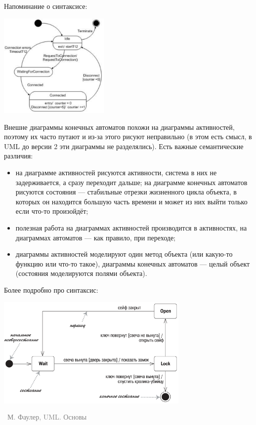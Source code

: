 \documentclass[a5paper]{article}
\newcommand{\attribution}[1] {
    \vspace{-5mm}\begin{flushright}\begin{scriptsize}\textcolor{gray}{\textcopyright\, #1}\end{scriptsize}\end{flushright}
}
\begin{document}
Напоминание о синтаксисе:

\begin{center}
    \includegraphics[width=0.4\textwidth]{stateTransitionExample.png}
\end{center}

Внешне диаграммы конечных автоматов похожи на диаграммы активностей, поэтому их часто путают и из-за этого рисуют неправильно (в этом есть смысл, в UML до версии 2 эти диаграммы не разделялись). Есть важные семантические различия:

\begin{itemize}
    \item на диаграмме активностей рисуются активности, система в них не задерживается, а сразу переходит дальше; на диаграмме конечных автоматов рисуются состояния --- стабильные отрезки жизненного цикла объекта, в которых он находится большую часть времени и может из них выйти только если что-то произойдёт;
    \item полезная работа на диаграммах активностей производится в активностях, на диаграммах автоматов --- как правило, при переходе;
    \item диаграммы активностей моделируют один метод объекта (или какую-то функцию или что-то такое), диаграммы конечных автоматов --- целый объект (состояния моделируются полями объекта).
\end{itemize}

Более подробно про синтаксис:

\begin{center}
    \includegraphics[width=0.7\textwidth]{stateTransitionSyntax.png}
    \attribution{М. Фаулер, UML. Основы}
\end{center}
\end{document}
